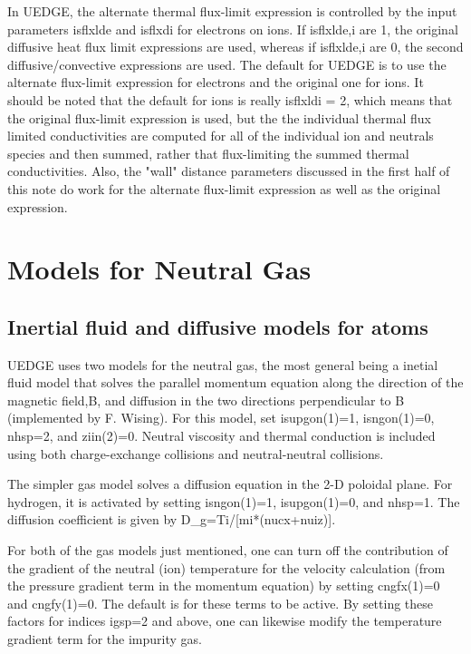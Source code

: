 \documentclass [12pt]{article}
\begin{document}
In UEDGE, the alternate thermal flux-limit expression is controlled by
the input parameters {\sf isflxlde} and {\sf isflxdi} for electrons on
ions.  If {\sf isflxlde,i} are 1, the original diffusive heat flux
limit expressions are used, whereas if {\sf isflxlde,i} are 0, the
second diffusive/convective expressions are used.  The default for
UEDGE is to use the alternate flux-limit expression for electrons and
the original one for ions.  It should be noted that the default for
ions is really {\sf isflxldi = 2}, which means that the original
flux-limit expression is used, but the the individual thermal flux
limited conductivities are computed for all of the individual ion and
neutrals species and then summed, rather that flux-limiting the summed
thermal conductivities.  Also, the "wall" distance parameters
discussed in the first half of this note do work for the alternate
flux-limit expression as well as the original expression.


\section{Models for Neutral Gas}
\subsection{Inertial fluid and diffusive models for atoms}

{\sf UEDGE} uses two models for the neutral gas, the most general being a
inetial fluid model that solves the parallel momentum equation along the
direction of the magnetic field,B, and diffusion in the two directions
perpendicular to B (implemented by F. Wising).  For this model, set {\sf
  isupgon(1)=1}, {\sf isngon(1)=0}, {\sf nhsp=2}, and {\sf ziin(2)=0}.
Neutral viscosity and thermal conduction is included using both
charge-exchange collisions and neutral-neutral collisions.

The simpler gas model solves a diffusion equation in the 2-D poloidal plane.
For hydrogen, it is activated by setting {\sf isngon(1)=1}, {\sf
  isupgon(1)=0}, and {\sf nhsp=1}.  The diffusion coefficient is given by
D\_g=Ti/[mi*(nucx+nuiz)].

For both of the gas models just mentioned, one can turn off the contribution
of the gradient of the neutral (ion) temperature for the velocity calculation
(from the pressure gradient term in the momentum equation) by setting {\sf
cngfx(1)=0} and {\sf cngfy(1)=0}. The default is for these terms to be active.
By setting these factors for indices igsp=2 and above, one can likewise
modify the temperature gradient term for the impurity gas.
\end{document}
